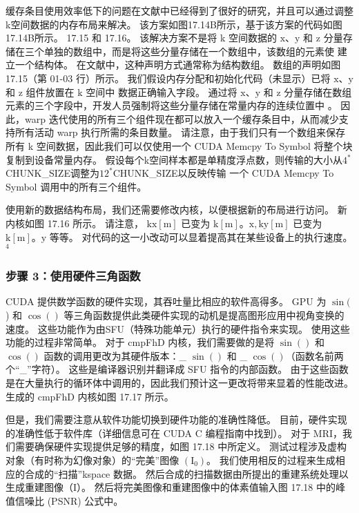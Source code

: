 缓存条目使用效率低下的问题在文献中已经得到了很好的研究，并且可以通过调整k空间数据的内存布局来解决。 该方案如图17.14B所示，基于该方案的代码如图17.14B所示。 17.15 和 17.16。 该解决方案不是将 k 空间数据的 $\mathrm{x}、\mathrm{y}$ 和 $\mathrm{z}$ 分量存储在三个单独的数组中，而是将这些分量存储在一个数组中，该数组的元素使 建立一个结构体。 在文献中，这种声明方式通常称为结构数组。 数组的声明如图 17.15（第 01-03 行）所示。 我们假设内存分配和初始化代码（未显示）已将 $\mathrm{x}、\mathrm{y}$ 和 $\mathrm{z}$ 组件放置在 $\mathrm{k}$ 空间中 数据正确输入字段。 通过将 $\mathrm{x}、\mathrm{y}$ 和 $\mathrm{z}$ 分量存储在数组元素的三个字段中，开发人员强制将这些分量存储在常量内存的连续位置中 。 因此，warp 迭代使用的所有三个组件现在都可以放入一个缓存条目中，从而减少支持所有活动 warp 执行所需的条目数量。 请注意，由于我们只有一个数组来保存所有 k 空间数据，因此我们可以仅使用一个 CUDA Memcpy To Symbol 将整个块复制到设备常量内存。 假设每个k空间样本都是单精度浮点数，则传输的大小从$4{}^{*}$CHUNK\_SIZE调整为$12^{*}$CHUNK\_SIZE以反映传输 一个 CUDA Memcpy To Symbol 调用中的所有三个组件。

使用新的数据结构布局，我们还需要修改内核，以便根据新的布局进行访问。 新内核如图 17.16 所示。 请注意， $\mathrm{kx}[\mathrm{m}]$ 已变为 $\mathrm{k}[\mathrm{m}] 。 \mathrm{x}, \mathrm{ky}[\mathrm{m}]$ 已变为 $\mathrm{k}[\mathrm{m}] 。 \mathrm{y}$ 等等。 对代码的这一小改动可以显着提高其在某些设备上的执行速度。 ${ }^{4}$

\subsubsection{步骤 3：使用硬件三角函数}
CUDA 提供数学函数的硬件实现，其吞吐量比相应的软件高得多。 GPU 为 $\sin ($ ) 和 $\cos ()$ 等三角函数提供此类硬件实现的动机是提高图形应用中视角变换的速度。 这些功能作为由SFU（特殊功能单元）执行的硬件指令来实现。 使用这些功能的过程非常简单。 对于 cmpFhD 内核，我们需要做的是将 $\sin ()$ 和 $\cos ()$ 函数的调用更改为其硬件版本：\_ $\sin ()$ 和 \_ $ \cos ()$（函数名前两个“\_”字符）。 这些是编译器识别并翻译成 SFU 指令的内部函数。 由于这些函数是在大量执行的循环体中调用的，因此我们预计这一更改将带来显着的性能改进。 生成的 cmpFhD 内核如图 17.17 所示。

但是，我们需要注意从软件功能切换到硬件功能的准确性降低。 目前，硬件实现的准确性低于软件库（详细信息可在 CUDA C 编程指南中找到）。 对于 MRI，我们需要确保硬件实现提供足够的精度，如图 17.18 中所定义。 测试过程涉及虚构对象（有时称为幻像对象）的“完美”图像 $\left(\mathrm{I}_{0}\right)$。 我们使用相反的过程来生成相应的合成的“扫描”kspace 数据。 然后合成的扫描数据由所提出的重建系统处理以生成重建图像（I）。 然后将完美图像和重建图像中的体素值输入图 17.18 中的峰值信噪比 (PSNR) 公式中。

